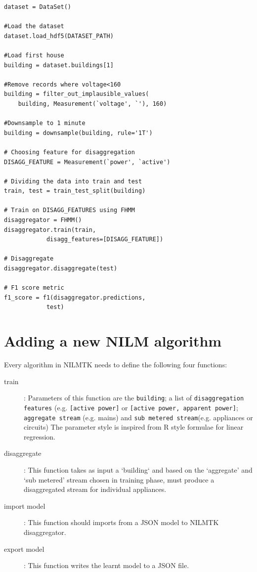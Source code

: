 \documentclass{sig-alternate}
\begin{document}
\begin{verbatim}
dataset = DataSet()

#Load the dataset
dataset.load_hdf5(DATASET_PATH)

#Load first house
building = dataset.buildings[1]

#Remove records where voltage<160 
building = filter_out_implausible_values(
    building, Measurement(`voltage', `'), 160)
    
#Downsample to 1 minute
building = downsample(building, rule='1T')

# Choosing feature for disaggregation
DISAGG_FEATURE = Measurement(`power', `active')

# Dividing the data into train and test
train, test = train_test_split(building)

# Train on DISAGG_FEATURES using FHMM
disaggregator = FHMM()
disaggregator.train(train, 
            disagg_features=[DISAGG_FEATURE])
            
# Disaggregate
disaggregator.disaggregate(test)

# F1 score metric
f1_score = f1(disaggregator.predictions, 
            test)
\end{verbatim}

\section{Adding a new NILM algorithm}
\noindent Every algorithm in NILMTK needs to define the following four functions:
\begin{description}
\item[train]: Parameters of this function are the \texttt{building}; a list of \texttt{disaggregation features} (e.g. \texttt{[active power]} or \texttt{[active power, apparent power]}; \texttt{aggregate stream} (e.g. mains) and \texttt{sub metered stream}(e.g. appliances or circuits)
The parameter style is inspired from R style formulae for linear regression. 
\item[disaggregate]: This function takes as input a `building` and based on the `aggregate' and `sub metered' stream chosen in training phase, must produce a disaggregated stream for individual appliances.
\item[import model]: This function should imports from a JSON model to NILMTK disaggregator.
\item[export model]: This function writes the learnt model to a JSON file.
\end{description}
\end{document}
